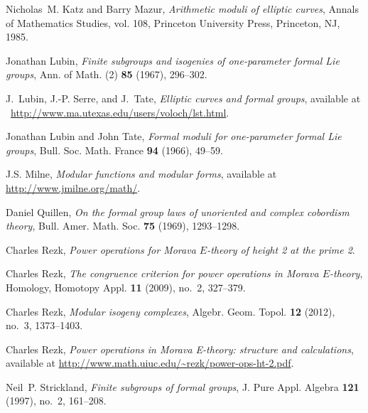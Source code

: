 \documentclass{gtpart}
\theoremstyle{definition}
\theoremstyle{remark}
\renewcommand{\=}{\approx}
\renewcommand{\-}{\sim}
\numberwithin{equation}{section}
\begin{document}
\begin{thebibliography}
Nicholas~M. Katz and Barry Mazur, \emph{Arithmetic moduli of elliptic curves},
  Annals of Mathematics Studies, vol. 108, Princeton University Press,
  Princeton, NJ, 1985. 

Jonathan Lubin, \emph{Finite subgroups and isogenies of one-parameter formal
  {L}ie groups}, Ann. of Math. (2) \textbf{85} (1967), 296--302. 

J.~Lubin, J.-P. Serre, and J.~Tate, \emph{Elliptic curves and formal groups},
  available at \,\! \href{http://www.ma.utexas.edu/users/voloch/lst.html}
  {http://www.ma.utexas.edu/users/voloch/lst.html}.

Jonathan Lubin and John Tate, \emph{Formal moduli for one-parameter formal
  {L}ie groups}, Bull. Soc. Math. France \textbf{94} (1966), 49--59.

J.S. Milne, \emph{Modular functions and modular forms}, available at \\
  \href{http://www.jmilne.org/math/CourseNotes/MF.pdf}
  {http://www.jmilne.org/math/}.

Daniel Quillen, \emph{On the formal group laws of unoriented and complex
  cobordism theory}, Bull. Amer. Math. Soc. \textbf{75} (1969), 1293--1298.

Charles Rezk, \emph{Power operations for {M}orava {$E$}-theory of height 2 at 
  the prime 2}. 

Charles Rezk, \emph{The congruence criterion for power operations in {M}orava
  {$E$}-theory}, Homology, Homotopy Appl. \textbf{11} (2009), no.~2, 327--379.

Charles Rezk, \emph{Modular isogeny complexes}, Algebr. Geom. Topol. \textbf{12}
  (2012), no.~3, 1373--1403. 

Charles Rezk, \emph{Power operations in Morava E-theory: structure and 
  calculations}, available at 
  \href{http://www.math.uiuc.edu/~rezk/power-ops-ht-2.pdf}
  {http://www.math.uiuc.edu/\textasciitilde rezk/power-ops-ht-2.pdf}.

Neil~P. Strickland, \emph{Finite subgroups of formal groups}, J. Pure Appl.
  Algebra \textbf{121} (1997), no.~2, 161--208. 


\end{thebibliography}
\end{document}
